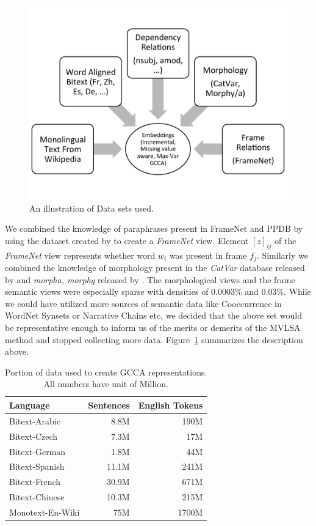 \documentclass[11pt]{article}
\begin{document}
\begin{figure}
  \includegraphics[trim=0 70 0 35,clip,width=\linewidth]{cartoonbw.pdf}
  \caption{An illustration of Data sets used.}
  \label{fig:cartoon}
  \end{figure}


We combined the knowledge of paraphrases present in FrameNet and PPDB by
using the dataset created by  to create a
\textit{FrameNet} view. Element $[z]_{ij}$ of the \textit{FrameNet}
view represents whether word $w_i$ was present in frame
$f_j$. Similarly we combined the knowledge of morphology present in
the \textit{CatVar} database released by  and
\textit{morpha, morphg} released by .
The morphological views and the frame semantic views were especially
sparse with densities of 0.0003\% and 0.03\%. While we could have utilized more sources of semantic data like
Cooccurrence in WordNet Synsets or Narrative Chains etc, we decided
that the above set would be representative enough to inform us of the
merits or demerits of the MVLSA method and stopped collecting more data. Figure~\ref{fig:cartoon} summarizes the description above.

\begin{table}[htbp]
  \centering
  \begin{tabular}{lrr}
    Language & Sentences & English Tokens \\
    \hline
    Bitext-Arabic   & 8.8M   & 190M  \\
    Bitext-Czech    & 7.3M   & 17M   \\
    Bitext-German   & 1.8M   & 44M   \\
    Bitext-Spanish  & 11.1M  & 241M  \\
    Bitext-French   & 30.9M  & 671M  \\
    Bitext-Chinese  & 10.3M  & 215M  \\
    Monotext-En-Wiki& 75M    & 1700M 
  \end{tabular}  
  \caption{Portion of data used to create GCCA representations. All
    numbers have unit of Million.}
  \label{tab:dataperlang}
\end{table}
\end{document}
